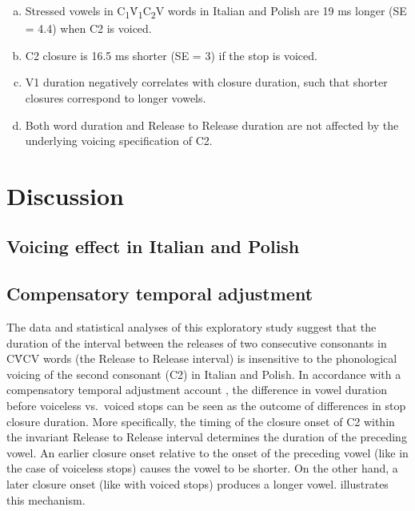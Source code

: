 \documentclass[12pt,]{article}
\begin{document}
\begin{enumerate}[(a)]
  \item Stressed vowels in C\textsubscript{1}V́\textsubscript{1}C\textsubscript{2}V words in Italian and Polish are 19 ms longer (SE = 4.4) when C2 is voiced.
  \item C2 closure is 16.5 ms shorter (SE = 3) if the stop is voiced.
  \item V1 duration negatively correlates with closure duration, such that shorter closures correspond to longer vowels.
  \item Both word duration and Release to Release duration are not affected by the underlying voicing specification of C2.
\end{enumerate}

\hypertarget{discussion}{%
\section{Discussion}\label{discussion}}

\label{s:discussion}

\hypertarget{voicing-effect-in-italian-and-polish}{%
\subsection{Voicing effect in Italian and
Polish}\label{voicing-effect-in-italian-and-polish}}

\hypertarget{compensatory-temporal-adjustment}{%
\subsection{Compensatory temporal
adjustment}\label{compensatory-temporal-adjustment}}

The data and statistical analyses of this exploratory study suggest that
the duration of the interval between the releases of two consecutive
consonants in CV́CV words (the Release to Release interval) is
insensitive to the phonological voicing of the second consonant (C2) in
Italian and Polish. In accordance with a compensatory temporal
adjustment account \citep{slis1969, lehiste1970}, the difference in
vowel duration before voiceless vs.~voiced stops can be seen as the
outcome of differences in stop closure duration. More specifically, the
timing of the closure onset of C2 within the invariant Release to
Release interval determines the duration of the preceding vowel. An
earlier closure onset relative to the onset of the preceding vowel (like
in the case of voiceless stops) causes the vowel to be shorter. On the
other hand, a later closure onset (like with voiced stops) produces a
longer vowel.  illustrates this mechanism.
\end{document}
